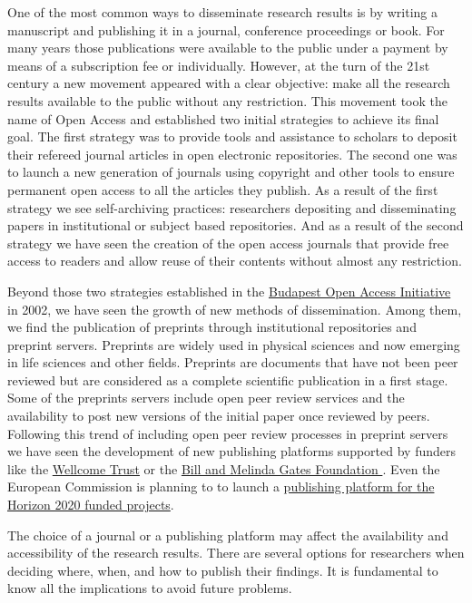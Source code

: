\documentclass{article}
\begin{document}
One of the most common ways to disseminate research results is by writing a manuscript and publishing it in a journal, conference proceedings or book. For many years those publications were available to the public under a payment by means of a subscription fee or individually. However, at the turn of the 21st century a new movement appeared with a clear objective: make all the research results available to the public without any restriction. This movement took the name of Open Access and established two initial strategies to achieve its final goal. The first strategy was to provide tools and assistance to scholars to deposit their refereed journal articles in open electronic repositories. The second one was to launch a new generation of journals using copyright and other tools to ensure permanent open access to all the articles they publish. As a result of the first strategy we see self-archiving practices: researchers depositing and disseminating papers in institutional or subject based repositories. And as a result of the second strategy we have seen the creation of the open access journals that provide free access to readers and allow reuse of their contents without almost any restriction.


Beyond those two strategies established in the \href{http://www.budapestopenaccessinitiative.org/read}{Budapest Open Access Initiative} in 2002, we have seen the growth of new methods of dissemination. Among them, we find the publication of preprints through institutional repositories and preprint servers. Preprints are widely used in physical sciences and now emerging in life sciences and other fields. Preprints are documents that have not been peer reviewed but are considered as a complete scientific publication in a first stage. Some of the preprints servers include open peer review services and the availability to post new versions of the initial paper once reviewed by peers. Following this trend of including open peer review processes in preprint servers we have seen the development of new publishing platforms supported by funders like the \href{https://wellcomeopenresearch.org/}{Wellcome Trust} or the \href{https://gatesopenresearch.org/}{Bill and Melinda Gates Foundation }. Even the European Commission is planning to to launch a \href{https://ec.europa.eu/research/openscience/pdf/information_note_platform_public.pdf}{publishing platform for the Horizon 2020 funded projects}.


The choice of a journal or a publishing platform may affect the availability and accessibility of the research results. There are several options for researchers when deciding where, when, and how to publish their findings. It is fundamental to know all the implications to avoid future problems.
\end{document}
